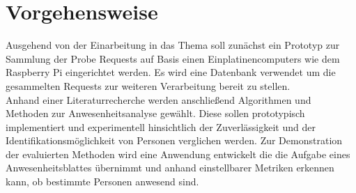 \section{Vorgehensweise}

Ausgehend von der Einarbeitung in das Thema soll zunächst ein Prototyp zur Sammlung der Probe Requests auf Basis einen Einplatinencomputers wie dem Raspberry Pi eingerichtet werden.
Es wird eine Datenbank verwendet um die gesammelten Requests zur weiteren Verarbeitung bereit zu stellen.
\\

Anhand einer Literaturrecherche werden anschließend Algorithmen und Methoden zur Anwesenheitsanalyse gewählt.
Diese sollen prototypisch implementiert und experimentell hinsichtlich der Zuverlässigkeit und der Identifikationsmöglichkeit von Personen verglichen werden.
Zur Demonstration der evaluierten Methoden wird eine Anwendung entwickelt die die Aufgabe eines Anwesenheitsblattes übernimmt und anhand einstellbarer Metriken erkennen kann, ob bestimmte Personen anwesend sind.